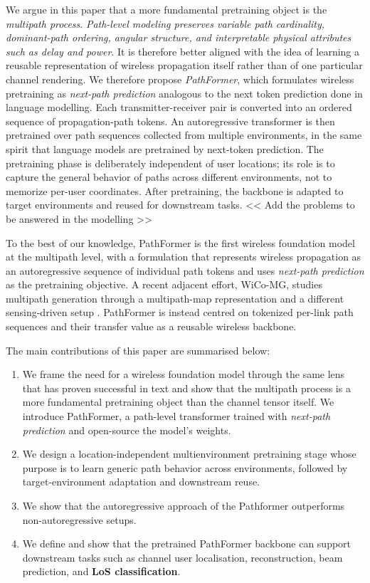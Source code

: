 We argue in this paper that a more fundamental pretraining object is the \emph{multipath process}. \emph{Path-level modeling preserves variable path cardinality, dominant-path ordering, angular structure, and interpretable physical attributes such as delay and power}. It is therefore better aligned with the idea of learning a reusable representation of wireless propagation itself rather than of one particular channel rendering. We therefore propose \emph{PathFormer}, which formulates wireless pretraining as \emph{next-path prediction} analogous to the next token prediction done in language modelling. Each transmitter-receiver pair is converted into an ordered sequence of propagation-path tokens. An autoregressive transformer is then pretrained over path sequences collected from multiple environments, in the same spirit that language models are pretrained by next-token prediction. The pretraining phase is deliberately independent of user locations; its role is to capture the general behavior of paths across different environments, not to memorize per-user coordinates. After pretraining, the backbone is adapted to target environments and reused for downstream tasks.
<< Add the problems to be answered in the modelling >>

To the best of our knowledge, PathFormer is the first wireless foundation model at the multipath level, with a formulation that represents wireless propagation as an autoregressive sequence of individual path tokens and uses \emph{next-path prediction} as the pretraining objective. A recent adjacent effort, WiCo-MG, studies multipath generation through a multipath-map representation and a different sensing-driven setup \cite{han2025wicomg}. PathFormer is instead centred on tokenized per-link path sequences and their transfer value as a reusable wireless backbone.

The main contributions of this paper are summarised below:
\begin{enumerate}[leftmargin=1.5em]
    \item We frame the need for a wireless foundation model through the same lens that has proven successful in text and show that the multipath process is a more fundamental pretraining object than the channel tensor itself. We introduce PathFormer, a path-level transformer trained with \emph{next-path prediction} and open-source the model's weights.
    \item We design a location-independent multienvironment pretraining stage whose purpose is to learn generic path behavior across environments, followed by target-environment adaptation and downstream reuse.
    \item We show that the autoregressive approach of the Pathformer outperforms non-autoregressive setups.
    \item We define and show that the pretrained PathFormer backbone can support downstream tasks such as channel user localisation, reconstruction, beam prediction, and \textbf{LoS classification}.

\end{enumerate}
